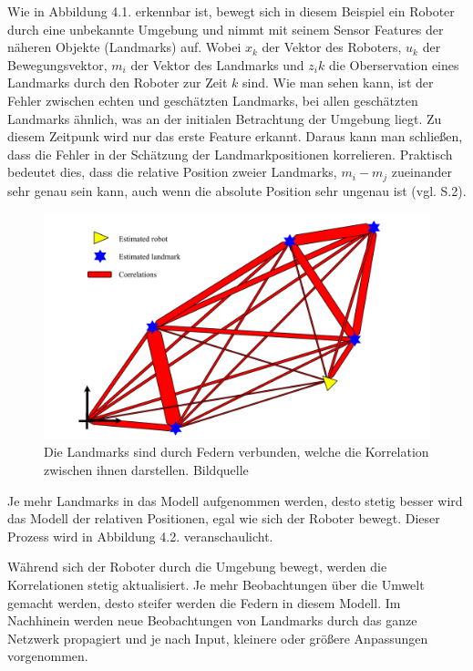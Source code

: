Wie in Abbildung 4.1. erkennbar ist, bewegt sich in diesem Beispiel ein Roboter durch eine unbekannte Umgebung und nimmt mit seinem Sensor Features der näheren Objekte (Landmarks) auf. Wobei $x_k$ der Vektor des Roboters,  $u_k$ der Bewegungsvektor, $m_i$ der Vektor des Landmarks und $z_ik$ die Oberservation eines Landmarks durch den Roboter zur Zeit $k$ sind. Wie man sehen kann, ist der Fehler zwischen echten und geschätzten Landmarks, bei allen geschätzten Landmarks ähnlich, was an der initialen Betrachtung der Umgebung liegt. Zu diesem Zeitpunk wird nur das erste Feature erkannt. Daraus kann man schließen, dass die Fehler in der Schätzung der Landmarkpositionen korrelieren. Praktisch bedeutet dies, dass die relative Position zweier Landmarks, $m_i - m_j$ zueinander sehr genau sein kann, auch wenn die absolute Position sehr ungenau ist (vgl. \cite{slam} S.2).

\begin{figure}[H]
	\centering
	\includegraphics[scale=0.6]{slam_springs.png}
	\caption{Die Landmarks sind durch \glqq Federn\grqq{} verbunden, welche die Korrelation zwischen ihnen darstellen.  Bildquelle \cite{slam}}
\end{figure}  


Je mehr Landmarks in das Modell aufgenommen werden, desto stetig besser wird das Modell der relativen Positionen, egal wie sich der Roboter bewegt. Dieser Prozess wird in Abbildung 4.2. veranschaulicht.

Während sich der Roboter durch die Umgebung bewegt, werden die Korrelationen stetig aktualisiert. Je mehr Beobachtungen über die Umwelt gemacht werden, desto steifer werden die Federn in diesem Modell. Im Nachhinein werden neue Beobachtungen von Landmarks durch das ganze Netzwerk propagiert und je nach Input, kleinere oder größere Anpassungen vorgenommen.

